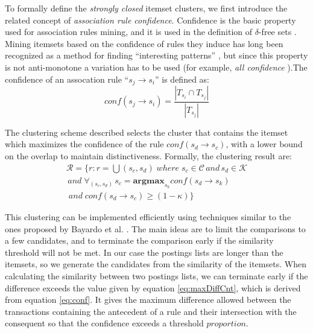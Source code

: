 \documentclass{sig-alternate}
\begin{document}
To formally define the \emph{strongly closed} itemset clusters, we first introduce the related concept of \emph{association rule confidence}. Confidence is the basic property used for association rules mining, and it is used in the definition of $\delta$-free sets \cite{boulicaut2003free}. Mining itemsets based on the confidence of rules they induce has long been recognized as a method for finding ``interesting patterns'' \cite{cohen2001finding}, but since this property is not anti-monotone a variation has to be used (for example, \emph{all confidence} \cite{kim2004ccmine}).The confidence of an assocation rule ``$s_{j} \rightarrow s_i$'' is  defined as:
\begin{equation}\label{eq:conf}conf(s_j \rightarrow s_i) = \frac{|T_{s_i} \cap T_{s_j}|}{|T_{s_j}|}\end{equation}

The clustering scheme described selects the cluster that contains the itemset which maximizes the confidence of the rule $conf(s_d \rightarrow s_c)$, with a lower bound on the overlap to maintain distinctiveness. Formally, the clustering result are: 
\begin{multline}\label{eq:strongClosedFormal}
\mathcal{R} = \{r: r = \bigcup{(s_c, s_d)}\; where\; s_c \in \mathcal{C} \, and \, s_d \in \mathcal{K} \\\,and\; \forall_{(s_c,s_d)} \, s_c = \textbf{argmax}_{s_k} conf(s_d \rightarrow s_k) \\\;and \;conf(s_d \rightarrow s_c) \ge (1 - \kappa)\}
\end{multline}

This clustering can be implemented efficiently using techniques similar to the ones proposed by Bayardo et al. \cite{bayardo2007scaling}. The main ideas are to limit the comparisons to a few candidates, and to terminate the comparison early if the similarity threshold will not be met. In our case the postings lists are longer than the itemsets, so we generate the candidates from the similarity of the itemsets. When calculating the similarity between two postings lists, we can terminate early if the difference exceeds the value given by equation \ref{eq:maxDiffCnt}, which is derived from equation \ref{eq:conf}. It gives the maximum difference allowed between the transactions containing the antecedent of a rule and their intersection with the consequent
so that the confidence exceeds a threshold $proportion$. 
\end{document}
